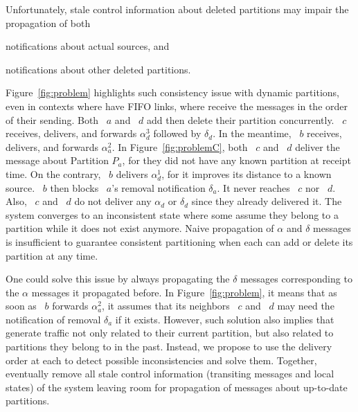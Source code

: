 

Unfortunately, stale control information about deleted partitions may
impair the propagation of both
\begin{inparaenum}[(i)]
\item notifications about actual sources, and
\item notifications about other deleted partitions.
\end{inparaenum}
Figure~\ref{fig:problem} highlights such consistency issue with
dynamic partitions, even in contexts where \processes have FIFO links,
\ie where \processes receive the messages in the order of their
sending. Both \Process~$a$ and \Process~$d$ add then delete their
partition concurrently. \Process~$c$ receives, delivers, and forwards
$\alpha_d^3$ followed by $\delta_d$. In the meantime, \Process~$b$
receives, delivers, and forwards $\alpha_a^2$. In
Figure~\ref{fig:problemC}, both \Process~$c$ and \Process~$d$ deliver
the message about Partition $P_a$, for they did not have any known
partition at receipt time. On the contrary, \Process~$b$ delivers
$\alpha_d^1$, for it improves its distance to a known
source. \Process~$b$ then blocks \Process~$a$'s removal notification
$\delta_a$. It never reaches \Process~$c$ nor \Process~$d$. Also,
\Process~$c$ and \Process~$d$ do not deliver any $\alpha_d$ or
$\delta_d$ since they already delivered it. The system converges to an
inconsistent state where some \processes assume they belong to a
partition while it does not exist anymore. Naive propagation of
$\alpha$ and $\delta$ messages is insufficient to guarantee consistent
partitioning when each \process can add or delete its partition at any
time.

One could solve this issue by always propagating the $\delta$ messages
corresponding to the $\alpha$ messages it propagated before. In
Figure~\ref{fig:problem}, it means that as soon as \Process~$b$
forwards $\alpha_a^2$, it assumes that its neighbors \Process~$c$ and
\Process~$d$ may need the notification of removal $\delta_a$ if it
exists. However, such solution also implies that \processes generate
traffic not only related to their current partition, but also related
to partitions they belong to in the past. Instead, we propose to use
the delivery order at each \process to detect possible inconsistencies
and solve them. Together, \processes eventually remove all stale
control information (transiting messages and local states) of the
system leaving room for propagation of messages about up-to-date
partitions.

